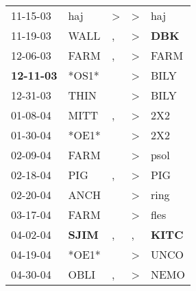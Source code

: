 \begin{supertabular}{p{0.07\textwidth}p{0.06\textwidth}p{0.02\textwidth}p{0.02\textwidth}p{0.06\textwidth}}
          11-15-03\textsuperscript{} &            haj\textsuperscript{} &     \textgreater &     \textgreater &            haj\textsuperscript{} \\
          11-19-03\textsuperscript{} &           WALL\textsuperscript{} &                , &     \textgreater &   \textbf{DBK\textsuperscript{}} \\
          12-06-03\textsuperscript{} &           FARM\textsuperscript{} &                , &     \textgreater &           FARM\textsuperscript{} \\
 \textbf{12-11-03\textsuperscript{}} &                            *OS1* &                  &     \textgreater &           BILY\textsuperscript{} \\
          12-31-03\textsuperscript{} &           THIN\textsuperscript{} &                  &     \textgreater &           BILY\textsuperscript{} \\
          01-08-04\textsuperscript{} &           MITT\textsuperscript{} &                , &     \textgreater &            2X2\textsuperscript{} \\
          01-30-04\textsuperscript{} &                            *OE1* &                  &     \textgreater &            2X2\textsuperscript{} \\
          02-09-04\textsuperscript{} &           FARM\textsuperscript{} &                  &     \textgreater &           psol\textsuperscript{} \\
          02-18-04\textsuperscript{} &            PIG\textsuperscript{} &                , &     \textgreater &            PIG\textsuperscript{} \\
          02-20-04\textsuperscript{} &           ANCH\textsuperscript{} &                  &     \textgreater &           ring\textsuperscript{} \\
          03-17-04\textsuperscript{} &           FARM\textsuperscript{} &                  &     \textgreater &           fles\textsuperscript{} \\
          04-02-04\textsuperscript{} &  \textbf{SJIM\textsuperscript{}} &                , &                , &  \textbf{KITC\textsuperscript{}} \\
          04-19-04\textsuperscript{} &                            *OE1* &                  &     \textgreater &           UNCO\textsuperscript{} \\
          04-30-04\textsuperscript{} &           OBLI\textsuperscript{} &                , &     \textgreater &           NEMO\textsuperscript{} \\

\end{supertabular}
